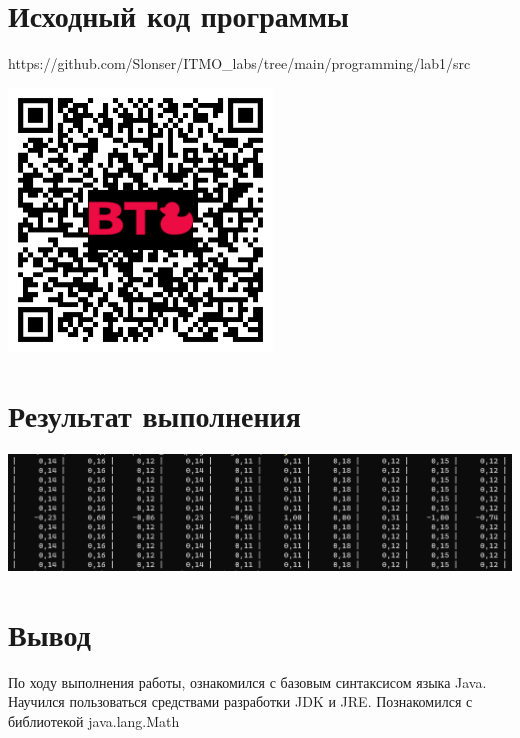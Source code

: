 \documentclass[12pt,onecolumn]{article}
\begin{document}
\section{Исходный код программы}
https://github.com/Slonser/ITMO\_labs/tree/main/programming/lab1/src
\begin{center}
  \includegraphics[width=7cm]{img/qr-code.png}
\end{center}

\newpage
\section{Результат выполнения}
\includegraphics[width=\columnwidth]{img/result.png}

\newpage
\section{Вывод}
По ходу выполнения работы,  ознакомился с базовым синтаксисом языка Java. Научился пользоваться средствами разработки JDK и JRE. Познакомился с библиотекой java.lang.Math
\end{document}
